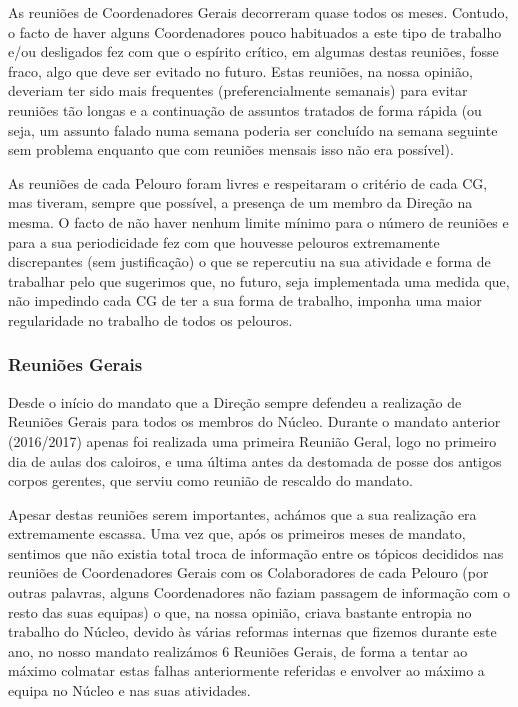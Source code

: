 As reuniões de Coordenadores Gerais decorreram quase todos os meses. Contudo, o facto de haver alguns Coordenadores pouco habituados a este tipo de trabalho e/ou desligados fez com que o espírito crítico, em algumas destas reuniões, fosse fraco, algo que deve ser evitado no futuro. Estas reuniões, na nossa opinião, deveriam ter sido mais frequentes (preferencialmente semanais) para evitar reuniões tão longas e a continuação de assuntos tratados de forma rápida (ou seja, um assunto falado numa semana poderia ser concluído na semana seguinte sem problema enquanto que com reuniões mensais isso não era possível).

As reuniões de cada Pelouro foram livres e respeitaram o critério de cada CG, mas tiveram, sempre que possível, a presença de um membro da Direção na mesma. O facto de não haver nenhum limite mínimo para o número de reuniões e para a sua periodicidade fez com que houvesse pelouros extremamente discrepantes (sem justificação) o que se repercutiu na sua atividade e forma de trabalhar pelo que sugerimos que, no futuro, seja implementada uma medida que, não impedindo cada CG de ter a sua forma de trabalho, imponha uma maior regularidade no trabalho de todos os pelouros.

\subsubsection{Reuniões Gerais}

Desde o início do mandato que a Direção sempre defendeu a realização de Reuniões Gerais para todos os membros do Núcleo. Durante o mandato anterior (2016/2017) apenas foi realizada uma primeira Reunião Geral, logo no primeiro dia de aulas dos caloiros, e uma última antes da destomada de posse dos antigos corpos gerentes, que serviu como reunião de rescaldo do mandato.

Apesar destas reuniões serem importantes, achámos que a sua realização era extremamente escassa. Uma vez que, após os primeiros meses de mandato, sentimos que não existia total troca de informação entre os tópicos decididos nas reuniões de Coordenadores Gerais com os Colaboradores de cada Pelouro (por outras palavras, alguns Coordenadores não faziam passagem de informação com o resto das suas equipas) o que, na nossa opinião, criava bastante entropia no trabalho do Núcleo, devido às várias reformas internas que fizemos durante este ano, no nosso mandato realizámos 6 Reuniões Gerais, de forma a tentar ao máximo colmatar estas falhas anteriormente referidas e envolver ao máximo a equipa no Núcleo e nas suas atividades.

